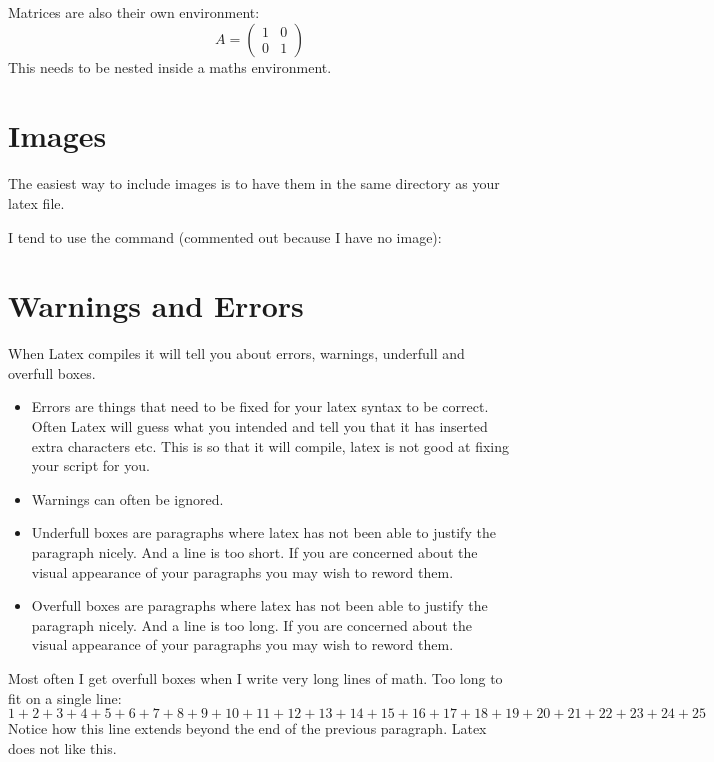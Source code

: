 \documentclass[a4paper,11pt]{article}
\begin{document}
Matrices are also their own environment:
\[
A = \left( \begin{array}{cc}
1 & 0 \\
0 & 1 \end{array} \right)
\]
This needs to be nested inside a maths environment.

\section{Images}

The easiest way to include images is to have them in the same directory as your latex file.

I tend to use the command (commented out because I have no image):

\section{Warnings and Errors}

When Latex compiles it will tell you about errors, warnings, underfull and overfull boxes.
\begin{itemize}
\item Errors are things that need to be fixed for your latex syntax to be correct. Often Latex will guess what you intended and tell you that it has inserted extra characters etc. This is so that it will compile, latex is not good at fixing your script for you.
\item Warnings can often be ignored.
\item Underfull boxes are paragraphs where latex has not been able to justify the paragraph nicely. And a line is too short. If you are concerned about the visual appearance of your paragraphs you may wish to reword them.
\item Overfull boxes are paragraphs where latex has not been able to justify the paragraph nicely. And a line is too long. If you are concerned about the visual appearance of your paragraphs you may wish to reword them.
\end{itemize}

Most often I get overfull boxes when I write very long lines of math. Too long to fit on a single line:
\[
1 + 2 + 3 + 4 + 5 + 6 + 7 + 8 + 9 + 10 + 11 + 12 + 13 + 14 + 15 + 16 + 17 + 18 + 19 + 20 + 21 + 22 + 23 + 24 + 25
\]
Notice how this line extends beyond the end of the previous paragraph. Latex does not like this.

\end{document}
